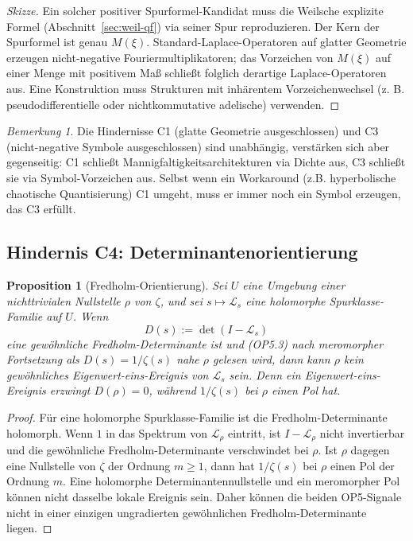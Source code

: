 \documentclass[11pt]{article}
\newtheorem{proposition}[theorem]{Proposition}
\theoremstyle{definition}
\theoremstyle{remark}
\newtheorem{remark}[theorem]{Bemerkung}
\begin{document}
\begin{proof}[Skizze]
Ein solcher positiver Spurformel-Kandidat muss die Weilsche explizite Formel
(Abschnitt~\ref{sec:weil-qf}) via seiner Spur reproduzieren. Der Kern der
Spurformel ist genau $M(\xi)$. Standard-Laplace-Operatoren auf glatter Geometrie
erzeugen nicht-negative Fouriermultiplikatoren; das Vorzeichen von $M(\xi)$ auf einer
Menge mit positivem Maß schließt folglich derartige Laplace-Operatoren aus.
Eine Konstruktion muss Strukturen mit inhärentem Vorzeichenwechsel (z. B.
pseudodifferentielle oder nichtkommutative adelische) verwenden.
\end{proof}

\begin{remark}\label{rem:ne-a-connection}
Die Hindernisse C1 (glatte Geometrie ausgeschlossen) und C3 (nicht-negative
Symbole ausgeschlossen) sind unabhängig, verstärken sich aber gegenseitig: C1
schließt Mannigfaltigkeitsarchitekturen via Dichte aus, C3 schließt sie
via Symbol-Vorzeichen aus. Selbst wenn ein Workaround (z.B.
hyperbolische chaotische Quantisierung) C1 umgeht, muss er immer noch
ein Symbol erzeugen, das C3 erfüllt.
\end{remark}

\subsection{Hindernis C4: Determinantenorientierung}
\label{sec:obs-C4}

\begin{proposition}[Fredholm-Orientierung]\label{prop:fredholm-orientation}
Sei $U$ eine Umgebung einer nichttrivialen Nullstelle $\rho$ von
$\zeta$, und sei $s\mapsto\mathcal{L}_s$ eine holomorphe
Spurklasse-Familie auf $U$. Wenn
\[
  D(s):=\det(I-\mathcal{L}_s)
\]
eine gewöhnliche Fredholm-Determinante ist und (OP5.3) nach
meromorpher Fortsetzung als $D(s)=1/\zeta(s)$ nahe $\rho$ gelesen
wird, dann kann $\rho$ kein gewöhnliches Eigenwert-eins-Ereignis von
$\mathcal{L}_s$ sein. Denn ein Eigenwert-eins-Ereignis erzwingt
$D(\rho)=0$, während $1/\zeta(s)$ bei $\rho$ einen Pol hat.
\end{proposition}

\begin{proof}
Für eine holomorphe Spurklasse-Familie ist die Fredholm-Determinante
holomorph. Wenn $1$ in das Spektrum von $\mathcal{L}_\rho$ eintritt,
ist $I-\mathcal{L}_\rho$ nicht invertierbar und die gewöhnliche
Fredholm-Determinante verschwindet bei $\rho$. Ist $\rho$ dagegen eine
Nullstelle von $\zeta$ der Ordnung $m\geq 1$, dann hat $1/\zeta(s)$
bei $\rho$ einen Pol der Ordnung $m$. Eine holomorphe
Determinantennullstelle und ein meromorpher Pol können nicht dasselbe
lokale Ereignis sein. Daher können die beiden OP5-Signale nicht in
einer einzigen ungradierten gewöhnlichen Fredholm-Determinante liegen.
\end{proof}
\end{document}
